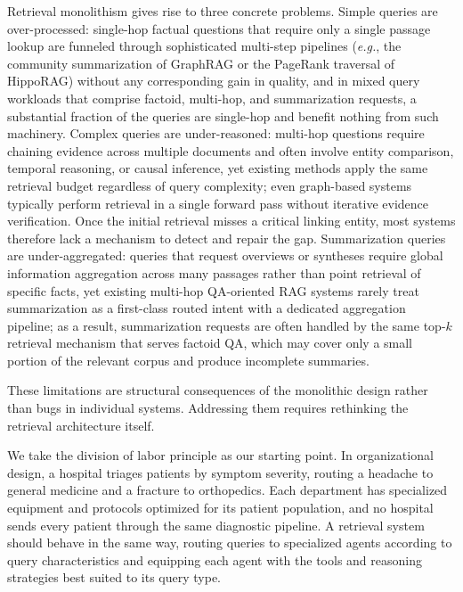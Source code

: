 \documentclass[11pt,a4paper]{article}
\newcommand{\eg}{\textit{e.g.}}
\begin{document}

Retrieval monolithism gives rise to three concrete problems.
Simple queries are over-processed: single-hop factual questions that require only a single passage lookup are funneled through sophisticated multi-step pipelines (\eg, the community summarization of GraphRAG or the PageRank traversal of HippoRAG) without any corresponding gain in quality, and in mixed query workloads that comprise factoid, multi-hop, and summarization requests, a substantial fraction of the queries are single-hop and benefit nothing from such machinery.
Complex queries are under-reasoned: multi-hop questions require chaining evidence across multiple documents and often involve entity comparison, temporal reasoning, or causal inference, yet existing methods apply the same retrieval budget regardless of query complexity; even graph-based systems typically perform retrieval in a single forward pass without iterative evidence verification. Once the initial retrieval misses a critical linking entity, most systems therefore lack a mechanism to detect and repair the gap.
Summarization queries are under-aggregated: queries that request overviews or syntheses require global information aggregation across many passages rather than point retrieval of specific facts, yet existing multi-hop QA-oriented RAG systems rarely treat summarization as a first-class routed intent with a dedicated aggregation pipeline; as a result, summarization requests are often handled by the same top-$k$ retrieval mechanism that serves factoid QA, which may cover only a small portion of the relevant corpus and produce incomplete summaries.

These limitations are structural consequences of the monolithic design rather than bugs in individual systems.
Addressing them requires rethinking the retrieval architecture itself.


We take the division of labor principle as our starting point.
In organizational design, a hospital triages patients by symptom severity, routing a headache to general medicine and a fracture to orthopedics.
Each department has specialized equipment and protocols optimized for its patient population, and no hospital sends every patient through the same diagnostic pipeline.
A retrieval system should behave in the same way, routing queries to specialized agents according to query characteristics and equipping each agent with the tools and reasoning strategies best suited to its query type.
\end{document}

